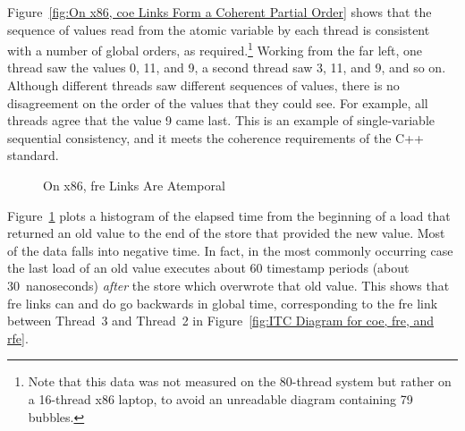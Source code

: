\documentclass[10]{article}
\begin{document}
Figure~\ref{fig:On x86, coe Links Form a Coherent Partial Order} shows
that the sequence of values read from the atomic variable by each
thread is consistent with a number of global orders, as
required.\footnote{
	Note that this data was not measured on the 80-thread system but
	rather on a 16-thread x86 laptop, to avoid an unreadable diagram
	containing 79 bubbles.}
Working from the far left, one thread saw the values 0, 11, and 9,
a second thread saw 3, 11, and 9, and so on.
Although different threads saw different sequences of values, there is no
disagreement on the order of the values that they could see.
For example, all threads agree that the value 9 came last.
This is an example of single-variable sequential consistency, and it
meets the coherence requirements of the C++ standard.

\begin{figure}[tb]
\begin{center}
\caption{On x86, fre Links Are Atemporal}
\label{fig:On x86, fre Links Are Atemporal}
\end{center}
\end{figure}

Figure~\ref{fig:On x86, fre Links Are Atemporal}
plots a histogram of the elapsed time from the beginning of a load that
returned an old value to the end of the store that provided the new value.
Most of the data falls into negative time.
In fact, in the most commonly occurring case the last load of an old value
executes about 60 timestamp periods (about 30~nanoseconds) \emph{after}
the store which overwrote that old value.
This shows that fre links can and do go backwards in global time,
corresponding to the fre link between Thread~3 and Thread~2 in
Figure~\ref{fig:ITC Diagram for coe, fre, and rfe}.
\end{document}
